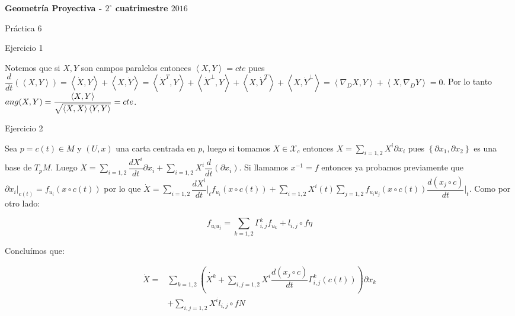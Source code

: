\documentclass[11pt]{article}
\newcommand\ip[1]{\left\langle#1\right\rangle}
\newcommand{\sett}[1]{\left\lbrace#1\right\rbrace}
\newcommand{\Bigsum}[2]{\sum\limits_{#1}{#2}}
\newenvironment{proof}[1][Demostraci\'on]{\begin{trivlist}
		\item[\hskip \labelsep {\bfseries #1}]}{\end{trivlist}}
\newcommand{\qed}{\nobreak \ifvmode \relax \else
	\ifdim\lastskip<1.5em \hskip-\lastskip
	\hskip1.5em plus0em minus0.5em \fi \nobreak
	\vrule height0.75em width0.5em depth0.25em\fi}
\begin{document}
	
	\pagestyle{empty}
	\pagestyle{fancy}
	\fancyfoot[CO]{\slshape \thepage}
	\renewcommand{\headrulewidth}{0pt}
	
	
	
	\centerline{\bf Geometr\'ia Proyectiva - $2^{\circ}$ cuatrimestre $2016$}
	\centerline{\sc Pr\'actica 6}
	
	\bigskip
	
\begin{enumerate}
	
	\item Ejercicio 1
	
	\label{Ejercicio 1}
	
	\begin{proof}
		
		Notemos que si $X,Y$ son campos paralelos entonces $\ip{X,Y} = cte$ pues $\dfrac{d}{dt} (\ip{X,Y}) = \ip{\dot{X},Y} + \ip{X,\dot{Y}} = \ip{\dot{X}^{T},Y} + \ip{\dot{X}^{\perp},Y} + \ip{X,\dot{Y}^{T}} + \ip{X,\dot{Y}^{\perp}} = \ip{\nabla_D X ,Y} + \ip{X,\nabla_DY} = 0$. Por lo tanto $\mathnormal{ang}(X,Y) = \dfrac{\ip{X,Y}}{\sqrt{\ip{X,X} \ip{Y,Y}}} = cte$. \qed
		
	\end{proof}
	
	\item Ejercicio 2
	
	\label{Ejercicio 2}
	
	\begin{proof}
		
		Sea $p=c(t) \in M$ y $(U,x)$ una carta centrada en $p$, luego si tomamos $X \in \mathcal{X}_c$ entonces  $X = \Bigsum{i = 1,2}{X^i \partial x_i}$ pues $\sett{\partial{x_1, \partial x_2}}$ es una base de $T_pM$. Luego $\dot{X} = \Bigsum{i = 1,2}{\dfrac{dX^i}{dt} \partial x_i} + \Bigsum{i = 1,2}{X^i \dfrac{d}{dt}\left(\partial x_i \right)}$. Si llamamos $x^{-1} = f$ entonces ya probamos previamente que $\partial{x_i}|_{c(t)} = f_{u_i}(x \circ c(t))$ por lo que $\dot{X} = \Bigsum{i = 1,2}{\dfrac{dX^i}{dt}|_{t} f_{u_i}(x \circ c(t))} + \Bigsum{i = 1,2}{X^i(t) \Bigsum{j =1,2}{f_{u_i u_j}(x \circ c(t)) \dfrac{d (x_j \circ c)}{dt}|_{t}}}$. Como por otro lado:
		
		\[
		f_{u_iu_j} = \Bigsum{k = 1,2}{\Gamma_{i,j}^{k} f_{u_k} + l_{i,j} \circ f \eta}
		\]
		
		Conclu\'imos que:
		
		\[
		\begin{aligned}
		\dot{X} = & \Bigsum{k = 1,2}{\left(\dot{X^k} + \Bigsum{i,j = 1,2}{ X^i \dfrac{d(x_j \circ c)}{dt} \Gamma_{i,j}^{k}(c(t))} \right) \partial x_k} \\
				  & + \Bigsum{i,j = 1,2}{X^i l_{i,j} \circ f} N
		\end{aligned}
		\]
		

\end{proof}
\end{enumerate}
\end{document}
